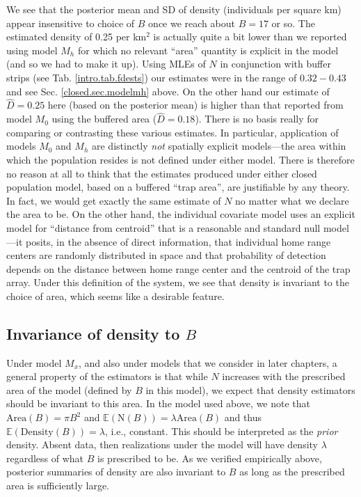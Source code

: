 We see that the posterior mean and SD of density (individuals per
square km) appear insensitive to choice of $B$ once we reach about
$B=17$ or so.
The estimated density of
0.25 per km$^2$ is actually quite a bit lower than we reported using
model $M_h$ for which no relevant ``area'' quantity is explicit in the
model (and so we had to make it up).  Using MLEs of $N$ in conjunction with buffer strips (see Tab.
\ref{intro.tab.fdests}) our estimates were in the range of
$0.32-0.43$ and see Sec.  \ref{closed.sec.modelmh} above.  On the
other hand our estimate of $\hat{D} = 0.25$ here (based on the
posterior mean) is higher than that reported from model $M_0$ using
the buffered area ($\hat{D} = 0.18$). There is no basis really for comparing or
contrasting these various estimates.
In
particular, application of models $M_0$ and $M_h$ are distinctly {\it
  not} spatially explicit models---the area within which the
population resides is not defined under either model. There is
therefore no reason at all to think that the estimates produced under
either closed population model, based on a buffered ``trap area'', are
justifiable by any theory. In fact, we would get exactly the same
estimate of $N$ no matter what we declare the area to be. On the other
hand, the individual covariate model uses an explicit model for
 ``distance from centroid'' that is a reasonable and
standard null model---it posits, in the absence of direct information,
that individual home range centers are randomly distributed in space
and that probability of detection depends on the distance between home
range center and the centroid of the trap array. Under this definition
of the system, we see that density is invariant to the choice of area,
which seems like a desirable feature.


\subsection{Invariance of density to $B$}

Under model $M_{x}$, and also under models that we
consider in later chapters, a general property of the estimators is
that while $N$ increases with the prescribed area of the model
(defined by $B$ in this model),
 we expect that density estimators should be
invariant to this area. In the model used above, we note that
$\mbox{Area}(B) = \pi B^{2}$ and $\mathbb{E}(\mbox{N}(B)) = \lambda
\mbox{Area}(B)$ and thus $\mathbb{E}(\mbox{Density}(B)) = \lambda$,
i.e., constant. This should be interpreted as the {\it prior}
density. Absent data, then realizations under the model will have
density $\lambda$ regardless of what $B$ is prescribed to be.  As we
verified empirically above,  posterior summaries of density are also invariant to
$B$ as long as the prescribed area is sufficiently large.

